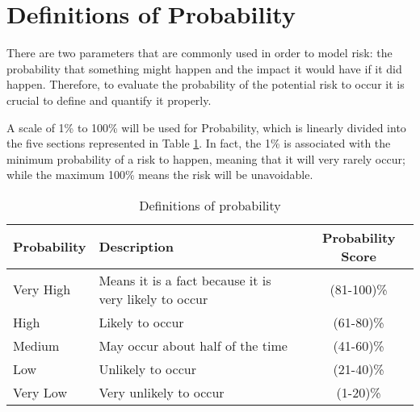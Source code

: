 \section{Definitions of Probability}
\label{3.1}
There are two parameters that are commonly used in order to model risk: the probability that something might happen and the impact it would have if it did happen. Therefore, to evaluate the probability of the potential risk to occur it is crucial to define and quantify it properly. 

A scale of 1\% to 100\% will be used for Probability, which is linearly divided into the five sections represented in Table \ref{definitionsofprobability}. In fact, the 1\% is associated with the minimum probability of a risk to happen, meaning that it will very rarely occur; while the maximum 100\% means the risk will be unavoidable.

\begin{table}[H]
	\centering
	\begin{tabular}{l >{\raggedright\arraybackslash}p{7.8cm} c}
		
		\toprule[2pt]
		
		\textbf{Probability} &  \textbf{Description}  & \textbf{Probability Score}\\
		
		\midrule [1.5pt]
		
		Very High & Means it is a fact because it is very likely to occur & (81-100)\% \vspace{0.2cm} \\
		
		\midrule
		
		High & Likely to occur & (61-80)\% \vspace{0.2cm} \\
		
		\midrule
		
		Medium & May occur about half of the time & (41-60)\% \vspace{0.2cm} \\
	
		\midrule
	
		Low & Unlikely to occur & (21-40)\% \vspace{0.2cm} \\
	
		\midrule
	
		Very Low & Very unlikely to occur & (1-20)\% \vspace{0.2cm} \\
			
		\bottomrule[2pt]

	\end{tabular}
	\caption{Definitions of probability}
	\label{definitionsofprobability}
\end{table}